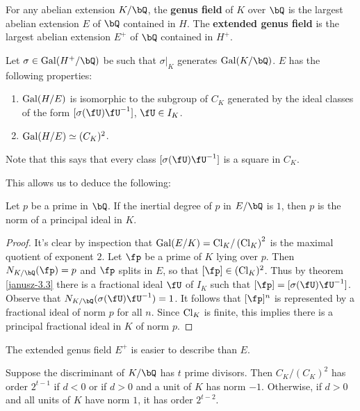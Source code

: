 \begin{defn}
    For any abelian extension $K / \bQ$, the \textbf{genus field} of $K$ over $\bQ$ is the largest abelian extension $E$ of $\bQ$ contained in $H$. The \textbf{extended genus field } is the largest abelian extension $E^{+}$ of $\bQ $ contained in $H^{+}$.
\end{defn}

Let $\sigma \in \Gal(H^{+} / \bQ)$ be such that $\sigma|_{K}$ generates $\Gal(K / \bQ)$. $E$ has the following properties:

\begin{thm}[Janusz 3.3]\label{janusz-3.3}
    \begin{enumerate}
        \item $\mathrm{Gal}(H / E)$ is isomorphic to the subgroup of $C_K$ generated by the ideal classes of the form $[\sigma(\fU)\fU^{-1}]$, $\fU \in I_K$. 
        \item $\mathrm{Gal}(H / E) \simeq (C_K)^2$. 
    \end{enumerate}
\end{thm}

Note that this says that every class $[\sigma(\fU) \fU^{-1}]$ is a square in $C_K$.

This allows us to deduce the following:

\begin{thm} 
Let $p$ be a prime in $\bQ$. If the inertial degree of $p$ in $E / \bQ$ is $1$, then $p$ is the norm of a principal ideal in $K$. 
\end{thm} 

\begin{proof}
It's clear by inspection that $\mathrm{Gal}(E / K) = \mathrm{Cl}_K / \left(\mathrm{Cl}_K\right)^2$ is the maximal quotient of exponent $2$. Let $\fp$ be a prime of $K$ lying over $p$. Then $N_{K / \bQ}(\fp) = p$ and $\fp$ splits in $E$, so that $[\fp] \in (\Cl_K)^2$. Thus by theorem \ref{janusz-3.3} there is a fractional ideal $\fU$ of $I_K$ such that 
$[\fp] = [\sigma(\fU)\fU^{-1}]$. Observe that $N_{K / \bQ}(\sigma(\fU)\fU^{-1}) = 1$. It follows that $[\fp]^n$ is represented by a fractional ideal of norm $p$ for all $n$. Since $\mathrm{Cl}_K$ is finite, this implies there is a principal fractional ideal in $K$ of norm $p$. 
\end{proof}

The extended genus field $E^{+}$ is easier to describe than $E$.

\begin{thm} 
Suppose the discriminant of $K / \bQ$ has $t$ prime divisors. Then $C_K / (C_K)^2$ has order $2^{t-1}$ if $d < 0$ or if $d > 0$ and a unit of $K$ has norm $-1$. Otherwise, if $d>0$ and all units of $K$ have norm $1$, it has order $2^{t - 2}$.
\end{thm} 

